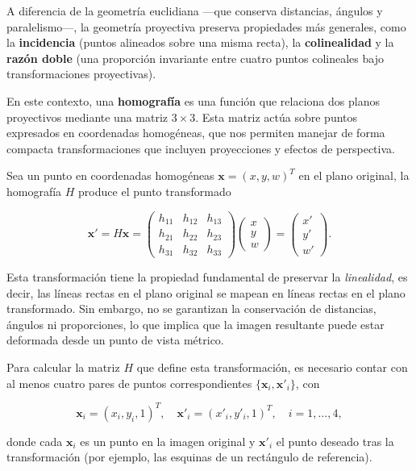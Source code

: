 A diferencia de la geometría euclidiana —que conserva distancias, ángulos y paralelismo—, la geometría proyectiva preserva propiedades más generales, como la \textbf{incidencia} (puntos alineados sobre una misma recta), la \textbf{colinealidad} y la \textbf{razón doble} (una proporción invariante entre cuatro puntos colineales bajo transformaciones proyectivas).

En este contexto, una \textbf{homografía} es una función que relaciona dos planos proyectivos mediante una matriz \(3 \times 3\). Esta matriz actúa sobre puntos expresados en coordenadas homogéneas, que nos permiten manejar de forma compacta transformaciones que incluyen proyecciones y efectos de perspectiva.

Sea un punto en coordenadas homogéneas \(\mathbf{x} = (x, y, w)^T\) en el plano original, la homografía \(H\) produce el punto transformado

\begin{equation}
\mathbf{x}' = H \mathbf{x} =
\begin{pmatrix}
h_{11} & h_{12} & h_{13} \\
h_{21} & h_{22} & h_{23} \\
h_{31} & h_{32} & h_{33}
\end{pmatrix}
\begin{pmatrix}
x \\ y \\ w
\end{pmatrix}
=
\begin{pmatrix}
x' \\ y' \\ w'
\end{pmatrix}.
\label{eq:homografia}
\end{equation}

Esta transformación tiene la propiedad fundamental de preservar la \textit{linealidad}, es decir, las líneas rectas en el plano original se mapean en líneas rectas en el plano transformado. Sin embargo, no se garantizan la conservación de distancias, ángulos ni proporciones, lo que implica que la imagen resultante puede estar deformada desde un punto de vista métrico.

Para calcular la matriz \(H\) que define esta transformación, es necesario contar con al menos cuatro pares de puntos correspondientes \(\{\mathbf{x}_i, \mathbf{x}'_i\}\), con

\[
\mathbf{x}_i = (x_i, y_i, 1)^T, \quad \mathbf{x}'_i = (x'_i, y'_i, 1)^T, \quad i = 1, \ldots, 4,
\]

donde cada \(\mathbf{x}_i\) es un punto en la imagen original y \(\mathbf{x}'_i\) el punto deseado tras la transformación (por ejemplo, las esquinas de un rectángulo de referencia).

